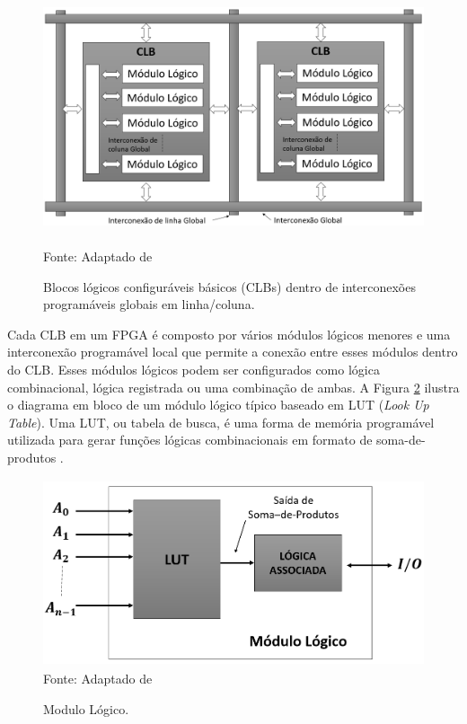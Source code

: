 \begin{figure}[!ht]
    \centering
    \caption{Blocos lógicos configuráveis básicos (CLBs) dentro de interconexões programáveis globais em linha/coluna.}
    \includegraphics[height = 7.5cm]{figuras/clb_bloc0.png}\\
    {\footnotesize Fonte: Adaptado de \cite{floyd2009sistemas}}
    \label{fig:clb_bloc}
\end{figure}

Cada CLB em um FPGA é composto por vários módulos lógicos menores e uma interconexão programável local que permite a conexão entre esses módulos dentro do CLB. Esses módulos lógicos podem ser configurados como lógica combinacional, lógica registrada ou uma combinação de ambas. A Figura \ref{fig:mod_log} ilustra o diagrama em bloco de um módulo lógico típico baseado em LUT (\textit{Look Up Table}). Uma LUT, ou tabela de busca, é uma forma de memória programável utilizada para gerar funções lógicas combinacionais em formato de soma-de-produtos \cite{floyd2009sistemas}.

\begin{figure}[!ht]
    \centering
    \caption{Modulo Lógico.}
   \includegraphics[height = 5.5cm]{figuras/Mod_log.png}\\
    {\footnotesize Fonte: Adaptado de \cite{floyd2009sistemas}}
    \label{fig:mod_log}
\end{figure}

